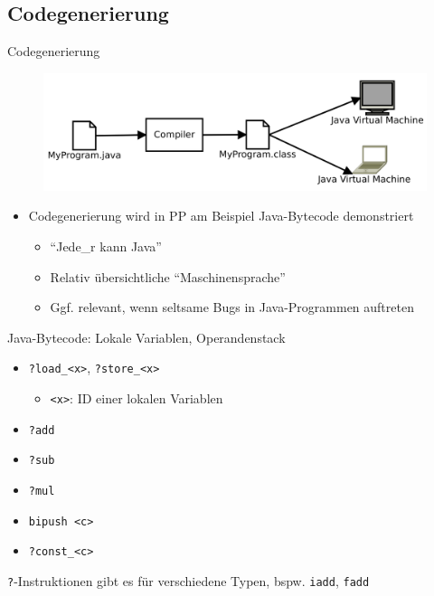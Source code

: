 \documentclass{beamer}
\begin{document}
\subsection{Codegenerierung}

\begin{frame}{Codegenerierung}
	\begin{figure}
		\includegraphics[width=\textwidth]{images/javabytecode}
	\end{figure}

	\begin{itemize}
		\item Codegenerierung wird in PP am Beispiel Java-Bytecode demonstriert
		\begin{itemize}
			\item \enquote{Jede_r kann Java}
			\item Relativ übersichtliche \enquote{Maschinensprache}
			\item Ggf. relevant, wenn seltsame Bugs in Java-Programmen auftreten
		\end{itemize}
	\end{itemize}
\end{frame}

\begin{frame}{Java-Bytecode: Lokale Variablen, Operandenstack}
	\begin{itemize}
		\item \texttt{?load_<x>}, \texttt{?store_<x>}
		\begin{itemize}
			\item \texttt{<x>}: ID einer lokalen Variablen
		\end{itemize}
		\item \texttt{?add}
		\item \texttt{?sub}
		\item \texttt{?mul}
		\item \texttt{bipush <c>}
		\item \texttt{?const_<c>}
	\end{itemize}

	\scriptsize

	\texttt{?}-Instruktionen gibt es für verschiedene Typen, bspw. \texttt{iadd}, \texttt{fadd}
\end{frame}
\end{document}
